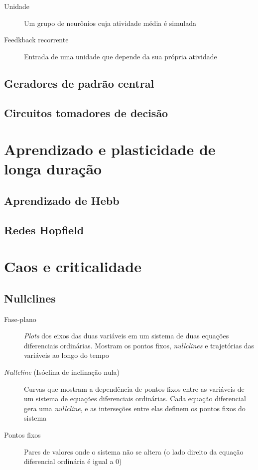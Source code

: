\begin{description}
	\item[Unidade] Um grupo de neurônios cuja atividade média é simulada
	\item[Feedkback recorrente] Entrada de uma unidade que depende da sua própria atividade
\end{description}



\subsection{Geradores de padrão central}

\subsection{Circuitos tomadores de decisão}

\section{Aprendizado e plasticidade de longa duração}\label{sec:aprendizado}

\subsection{Aprendizado de Hebb}

\subsection{Redes Hopfield}

\section{Caos e criticalidade}\label{sec:caos}

\subsection{Nullclines}
\begin{description}
	\item[Fase-plano] \textit{Plots} dos eixos das duas variáveis em um sistema de duas equações diferenciais ordinárias. Mostram os pontos fixos, \textit{nullclines} e trajetórias das variáveis ao longo do tempo
	\item[\textit{Nullcline} (Isóclina de inclinação nula)] Curvas que mostram a dependência de pontos fixos entre as variáveis de um sistema de equações diferenciais ordinárias. Cada equação diferencial gera uma \textit{nullcline}, e as interseções entre elas definem os pontos fixos do sistema
	\item[Pontos fixos] Pares de valores onde o sistema não se altera (o lado direito da equação diferencial ordinária é igual a 0)
\end{description}

